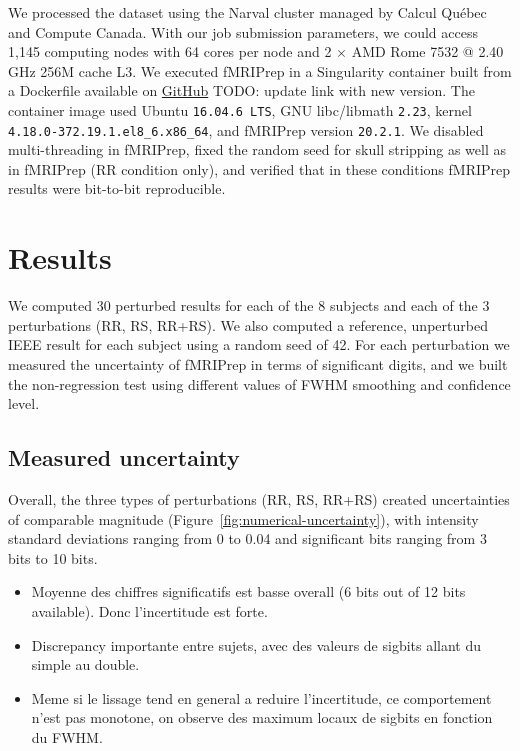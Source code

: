 \documentclass{article}
\newcommand{\TODO}[1]{\color{red}\textsc{TODO:} #1\color{black}\xspace}
\newcommand{\fmriprep}{fMRIPrep \xspace}
\begin{document}
We processed the dataset using the Narval cluster managed by Calcul Qu\'ebec and
Compute Canada. With our job submission parameters, we could access 1,145
computing nodes with 64 cores per node and 2 $\times$ AMD Rome 7532 @ 2.40 GHz
256M cache L3. We executed \fmriprep in a Singularity container built from a
Dockerfile available on
\href{https://github.com/SIMEXP/fmriprep-reproducibility/blob/master/fmriprep-reproducibility/containers/Dockerfile}{GitHub}
\TODO{update link with new version}. The container image used Ubuntu \texttt{16.04.6 LTS}, GNU
libc/libmath \texttt{2.23}, kernel \texttt{4.18.0-372.19.1.el8\_6.x86\_64}, and fMRIPrep version \texttt{20.2.1}. We disabled
multi-threading in fMRIPrep, fixed the random seed for skull stripping as well
as in fMRIPrep (RR condition only), and verified that in these conditions
fMRIPrep results were bit-to-bit reproducible.

\section{Results}

We computed 30 perturbed results for each of the 8 subjects and each of the 3
perturbations (RR, RS, RR+RS). We also computed a reference, unperturbed IEEE
result for each subject using a random seed of 42. For each perturbation we
measured the uncertainty of fMRIPrep in terms of significant digits, and we
built the non-regression test using different values of FWHM smoothing and confidence level.

\subsection{Measured uncertainty}

Overall, the three types of perturbations (RR, RS, RR+RS) created uncertainties
of comparable magnitude (Figure~\ref{fig:numerical-uncertainty}), with intensity
standard deviations ranging from 0 to 0.04 and significant bits ranging from 3
bits to 10 bits.
\begin{itemize}
    \item Moyenne des chiffres significatifs est basse overall (6 bits out of 12 bits available). Donc l'incertitude est forte.
    \item Discrepancy importante entre sujets, avec des valeurs de sigbits allant du simple au double.
    \item Meme si le lissage tend en general a reduire l'incertitude, ce comportement n'est pas monotone, on observe des maximum locaux de sigbits en fonction du FWHM.
\end{itemize}
\end{document}
